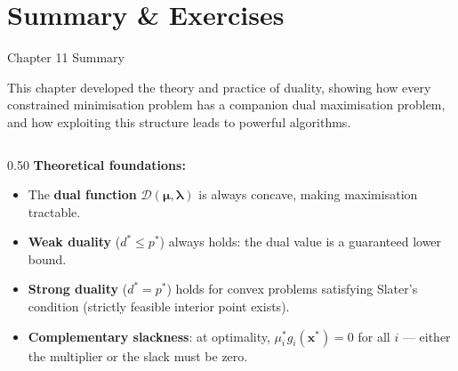 \documentclass[aspectratio=169,10pt]{beamer}
\newcommand{\bx}{\mathbf{x}}
\newcommand{\bmu}{\boldsymbol{\mu}}
\newcommand{\blam}{\boldsymbol{\lambda}}
\newcommand{\calD}{\mathcal{D}}
\begin{document}
\section{Summary \& Exercises}

\begin{frame}[allowframebreaks]{Chapter 11 Summary}

  This chapter developed the theory and practice of duality, showing how
  every constrained minimisation problem has a companion dual maximisation
  problem, and how exploiting this structure leads to powerful algorithms.

  \begin{columns}
    \begin{column}{0.50\textwidth}
      \textbf{Theoretical foundations:}
      \begin{itemize}
        \item The \textbf{dual function} $\calD(\bmu, \blam)$ is always
              concave, making maximisation tractable.
        \item \textbf{Weak duality} ($d^* \le p^*$) always holds:
              the dual value is a guaranteed lower bound.
        \item \textbf{Strong duality} ($d^* = p^*$) holds for convex
              problems satisfying Slater's condition (strictly feasible
              interior point exists).
        \item \textbf{Complementary slackness}: at optimality,
              $\mu_i^* g_i(\bx^*) = 0$ for all $i$ --- either the
              multiplier or the slack must be zero.
      \end{itemize}


\end{column}
\end{columns}
\end{frame}
\end{document}
